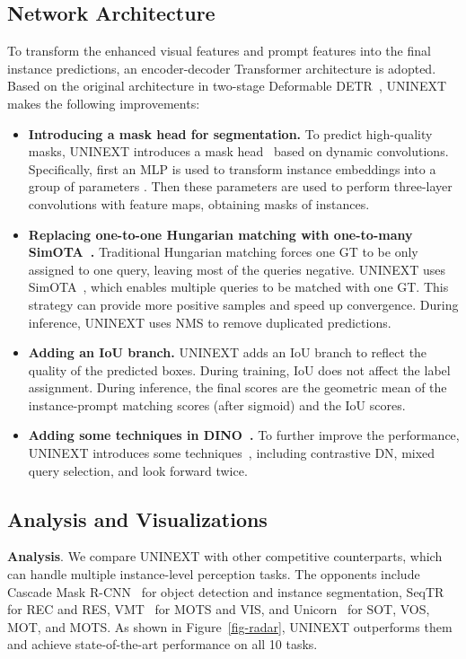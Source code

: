 \documentclass[10pt,twocolumn,letterpaper]{article}
\begin{document}
\subsection{Network Architecture}
\label{sec-network}
To transform the enhanced visual features  and prompt features  into the final instance predictions, an encoder-decoder Transformer architecture is adopted. Based on the original architecture in two-stage Deformable DETR~\cite{DeformableDETR}, UNINEXT makes the following improvements:
\begin{itemize}
\item{\textbf{Introducing a mask head for segmentation.}} To predict high-quality masks, UNINEXT introduces a mask head~\cite{CondInst} based on dynamic convolutions. Specifically, first an MLP is used to transform instance embeddings into a group of parameters . Then these parameters are used to perform three-layer  convolutions with feature maps, obtaining masks of instances.
\item{\textbf{Replacing one-to-one Hungarian matching with one-to-many SimOTA~\cite{YOLOX}.}} Traditional Hungarian matching forces one GT to be only assigned to one query, leaving most of the queries negative. UNINEXT uses SimOTA~\cite{YOLOX}, which enables multiple queries to be matched with one GT. This strategy can provide more positive samples and speed up convergence. During inference, UNINEXT uses NMS to remove duplicated predictions. 
\item{\textbf{Adding an IoU branch.}} UNINEXT adds an IoU branch to reflect the quality of the predicted boxes. During training, IoU does not affect the label assignment. During inference, the final scores are the geometric mean of the instance-prompt matching scores (after sigmoid) and the IoU scores.
\item{\textbf{Adding some techniques in DINO~\cite{DINO}.}} To further improve the performance, UNINEXT introduces some techniques~\cite{DINO}, including contrastive DN, mixed query selection, and look forward twice. 
\end{itemize}



\subsection{Analysis and Visualizations}
\label{sec-qualitative}

\textbf{Analysis}. We compare UNINEXT with other competitive counterparts, which can handle multiple instance-level perception tasks. The opponents include Cascade Mask R-CNN~\cite{CascadeRCNN} for object detection and instance segmentation, SeqTR~\cite{SeqTR} for REC and RES, VMT~\cite{VMT} for MOTS and VIS, and Unicorn~\cite{Unicorn} for SOT, VOS, MOT, and MOTS. As shown in Figure~\ref{fig-radar}, UNINEXT outperforms them and achieve state-of-the-art performance on all 10 tasks. 
\end{document}
